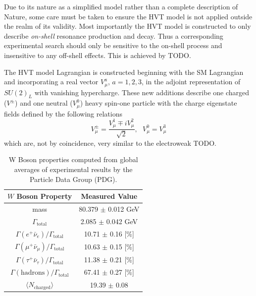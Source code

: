 Due to its nature as a simplified model rather than a complete description of Nature, some care must be taken to ensure the HVT model is not applied outside the realm of its validity.
Most importantly the HVT model is constructed to only describe \textit{on-shell} resonance production and decay.
Thus a corresponding experimental search should only be sensitive to the on-shell process and insensitive to any off-shell effects.
This is achieved by TODO.

The HVT model Lagrangian is constructed beginning with the SM Lagrangian and incorporating a real vector $V_\mu^a$, $a=1,2,3$, in the adjoint representation of $SU(2)_L$ with vanishing hypercharge.
These new additions describe one charged ($V^\pm$) and one neutral ($V_\mu^0$) heavy spin-one particle with the charge eigenstate fields defined by the following relations
\begin{equation}
V_\mu^\pm = \frac{V_\mu^1 \mp iV_\mu^2}{\sqrt{2}},\ \ \ V_\mu^0 = V_\mu^3
\end{equation}
which are, not by coincidence, very similar to the electroweak TODO.

\begin{table}[!htb]
\begin{center}
\begin{tabular}{|c|c|}
\hline
$W$ Boson Property & Measured Value \\ \hline
mass & 80.379 $\pm$ 0.012 GeV \\
\hline
$\Gamma_{\mathrm{total}}$ & 2.085 $\pm$ 0.042 GeV \\
$\Gamma(e^+ \bar{\nu}_e) / \Gamma_{\mathrm{total}}$ & 10.71 $\pm$ 0.16 [\%]\\
$\Gamma(\mu^+ \bar{\nu}_\mu) / \Gamma_{\mathrm{total}}$ & 10.63 $\pm$ 0.15 [\%]\\
$\Gamma(\tau^+ \bar{\nu}_\tau) / \Gamma_{\mathrm{total}}$ & 11.38 $\pm$ 0.21 [\%]\\
$\Gamma(\mathrm{hadrons}) / \Gamma_{\mathrm{total}}$ & 67.41 $\pm$ 0.27 [\%]\\
\hline
$\langle N_{\mathrm{charged}} \rangle$ & 19.39 $\pm$ 0.08 \\
\hline
\end{tabular}
\caption{
W Boson properties computed from global averages of experimental results by the Particle Data Group (PDG). \cite{PDG:PhysRevD.98.030001}
}
\label{tab:w_props}
\end{center}
\end{table}

